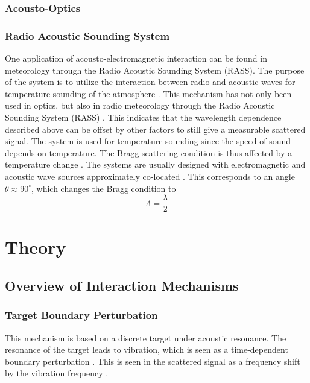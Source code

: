 \documentclass[10pt,a4paper]{eitExjobb}
\begin{document}
	\subsection{Acousto-Optics}
	
	\subsection{Radio Acoustic Sounding System}
	One application of acousto-electromagnetic interaction can be found in meteorology through the Radio Acoustic Sounding System (RASS). The purpose of the system is to utilize the interaction between radio and acoustic waves for temperature sounding of the atmosphere .
	This mechanism has not only been used in optics, but also in radio meteorology through the Radio Acoustic Sounding System (RASS) \cite{Buerkle2007}. This indicates that the wavelength dependence described above can be offset by other factors to still give a measurable scattered signal. The system is used for temperature sounding since the speed of sound depends on temperature. The Bragg scattering condition is thus affected by a temperature change \cite{Marshall1972}. The systems are usually designed with electromagnetic and acoustic wave sources approximately co-located \cite{Marshall1972}. This corresponds to an angle $\theta \approx 90^\circ$, which changes the Bragg condition to
	\begin{equation*}
	\Lambda = \frac{\lambda}{2}
	\end{equation*}
	
	\chapter{Theory \label{ch:theory}}
	
	\section{Overview of Interaction Mechanisms}
	
	\subsection{Target Boundary Perturbation}
	This mechanism is based on a discrete target under acoustic resonance. The resonance of the target leads to vibration, which is seen as a time-dependent boundary perturbation \cite{Buerkle2007}. This is seen in the scattered signal as a frequency shift by the vibration frequency \cite{Sarabandi2003}. 
	
\end{document}
